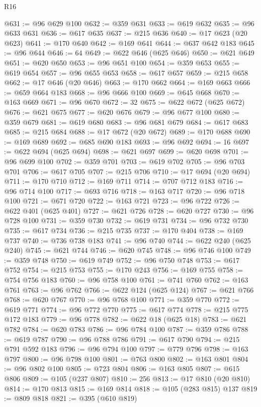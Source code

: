 \begin{lexlean}{R16}
\begin{coremodule}
@631 := @96 @629 @100
@632 := @359 @631
@633 := @619 @632
@635 := @96 @633 @631
@636 := @617 @635
@637 := @215 @636
@640 := @17 @623 (@20 @623)
@641 := @170 @640
@642 := @169 @641
@644 := @637 @642 @183
@645 := @96 @644
@646 := 64
@649 := @622 @646 (@625 @646)
@650 := @621 @649
@651 := @620 @650
@653 := @96 @651 @100
@654 := @359 @653
@655 := @619 @654
@657 := @96 @655 @653
@658 := @617 @657
@659 := @215 @658
@662 := @17 @646 (@20 @646)
@663 := @170 @662
@664 := @169 @663
@666 := @659 @664 @183
@668 := @96 @666 @100
@669 := @645 @668
@670 := @163 @669
@671 := @96 @670
@672 := 32
@675 := @622 @672 (@625 @672)
@676 := @621 @675
@677 := @620 @676
@679 := @96 @677 @100
@680 := @359 @679
@681 := @619 @680
@683 := @96 @681 @679
@684 := @617 @683
@685 := @215 @684
@688 := @17 @672 (@20 @672)
@689 := @170 @688
@690 := @169 @689
@692 := @685 @690 @183
@693 := @96 @692
@694 := 16
@697 := @622 @694 (@625 @694)
@698 := @621 @697
@699 := @620 @698
@701 := @96 @699 @100
@702 := @359 @701
@703 := @619 @702
@705 := @96 @703 @701
@706 := @617 @705
@707 := @215 @706
@710 := @17 @694 (@20 @694)
@711 := @170 @710
@712 := @169 @711
@714 := @707 @712 @183
@716 := @96 @714 @100
@717 := @693 @716
@718 := @163 @717
@720 := @96 @718 @100
@721 := @671 @720
@722 := @163 @721
@723 := @96 @722
@726 := @622 @401 (@625 @401)
@727 := @621 @726
@728 := @620 @727
@730 := @96 @728 @100
@731 := @359 @730
@732 := @619 @731
@734 := @96 @732 @730
@735 := @617 @734
@736 := @215 @735
@737 := @170 @404
@738 := @169 @737
@740 := @736 @738 @183
@741 := @96 @740
@744 := @622 @240 (@625 @240)
@745 := @621 @744
@746 := @620 @745
@748 := @96 @746 @100
@749 := @359 @748
@750 := @619 @749
@752 := @96 @750 @748
@753 := @617 @752
@754 := @215 @753
@755 := @170 @243
@756 := @169 @755
@758 := @754 @756 @183
@760 := @96 @758 @100
@761 := @741 @760
@762 := @163 @761
@763 := @96 @762
@766 := @622 @124 (@625 @124)
@767 := @621 @766
@768 := @620 @767
@770 := @96 @768 @100
@771 := @359 @770
@772 := @619 @771
@774 := @96 @772 @770
@775 := @617 @774
@778 := @215 @775 @172 @183
@779 := @96 @778
@782 := @622 @18 (@625 @18)
@783 := @621 @782
@784 := @620 @783
@786 := @96 @784 @100
@787 := @359 @786
@788 := @619 @787
@790 := @96 @788 @786
@791 := @617 @790
@794 := @215 @791 @592 @183
@796 := @96 @794 @100
@797 := @779 @796
@798 := @163 @797
@800 := @96 @798 @100
@801 := @763 @800
@802 := @163 @801
@804 := @96 @802 @100
@805 := @723 @804
@806 := @163 @805
@807 := @615 @806
@809 := @105 (@237 @807)
@810 := 256
@813 := @17 @810 (@20 @810)
@814 := @170 @813
@815 := @169 @814
@818 := @105 (@283 @815) @137
@819 := @809 @818
@821 := @395 (@610 @819)

\end{coremodule}
\end{lexlean}
